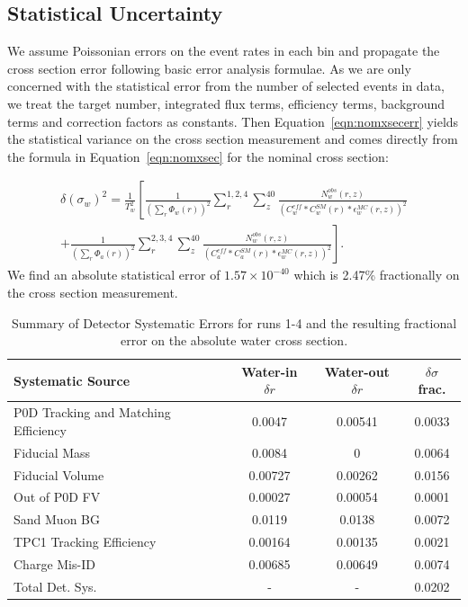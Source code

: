 
\subsection{Statistical Uncertainty}

We assume Poissonian errors on the event rates in each bin and propagate the cross section error following basic error analysis formulae. As we are only concerned with the statistical error from the number of selected events in data, we treat the target number, integrated flux terms, efficiency terms, background terms and correction factors as constants. Then Equation~\ref{eqn:nomxsecerr} yields the statistical variance on the cross section measurement and comes directly from the formula in Equation~\ref{eqn:nomxsec} for the nominal cross section:

\begin{multline}
\label{eqn:nomxsecerr}
\delta(\sigma_w)^2 = \frac{1}{T_w^2} \left[ \frac{1}{\left(\sum\limits_r \Phi_w(r)\right)^2} \sum\limits_{r}^{1,2,4} \sum\limits_{z}^{40} \frac{N^{obs}_w(r,z)}{(C_w^{eff}*C_w^{SM}(r)*\epsilon^{MC}_w(r,z))^2} \right. \\
	\left. +\frac{1}{\left(\sum\limits_r \Phi_a(r) \right)^2}\sum\limits_{r}^{2,3,4} \sum\limits_{z}^{40} \frac{N^{obs}_w(r,z)}{(C_a^{eff}*C_a^{SM}(r)*\epsilon^{MC}_w(r,z))^2}\right].
\end{multline}
We find an absolute statistical error of $1.57\times 10^{-40}$ which is 2.47\% fractionally on the cross section measurement.

\begin{table}[h]
\caption{Summary of Detector Systematic Errors for runs 1-4 and the resulting fractional error on the absolute water cross section.}
\centering
\begin{tabular}{lccc}\toprule\midrule
\renewcommand{\arraystretch}{1.1}
Systematic Source & Water-in $\delta r$  & Water-out $\delta r$ & $\delta\sigma$ frac.
\\ \midrule
P0D Tracking and Matching Efficiency & 0.0047 & 0.00541 & 0.0033\\
\midrule
Fiducial Mass & 0.0084 & 0 & 0.0064\\
\midrule
Fiducial Volume & 0.00727 & 0.00262 & 0.0156\\
\midrule
Out of P0D FV & 0.00027 & 0.00054 & 0.0001\\
\midrule
Sand Muon BG & 0.0119 & 0.0138 & 0.0072\\
\midrule
TPC1 Tracking Efficiency & 0.00164 & 0.00135 & 0.0021\\
\midrule
Charge Mis-ID & 0.00685  & 0.00649 & 0.0074\\
\midrule
\midrule
Total Det. Sys. &  - & - & 0.0202  \\
\midrule
\bottomrule
\end{tabular}
\label{tab:detsys}
\end{table}

